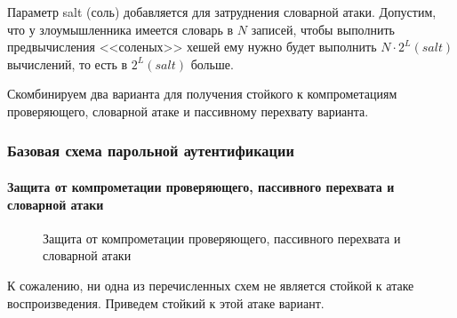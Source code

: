 Параметр salt (соль) добавляется для затруднения словарной атаки. Допустим, что у злоумышленника имеется словарь в $N$ записей, чтобы выполнить предвычисления <<соленых>> хешей ему нужно будет выполнить $N\cdot 2^L(salt)$ вычислений, то есть в $2^L(salt)$ больше.


Скомбинируем два варианта для получения стойкого к компрометациям проверяющего, словарной атаке и пассивному перехвату варианта.

\begin{frame}
\frametitle{Базовая схема парольной аутентификации}
\framesubtitle{Защита от компрометации проверяющего, пассивного перехвата и словарной атаки}
\begin{figure}
    \begin{center}
    \end{center}
    \caption{Защита от компрометации проверяющего, пассивного перехвата и словарной атаки}\label{pict:pwdhashtotal}
\end{figure} 
\end{frame}


К сожалению, ни одна из перечисленных схем не является стойкой к атаке воспроизведения. Приведем стойкий к этой атаке вариант.


